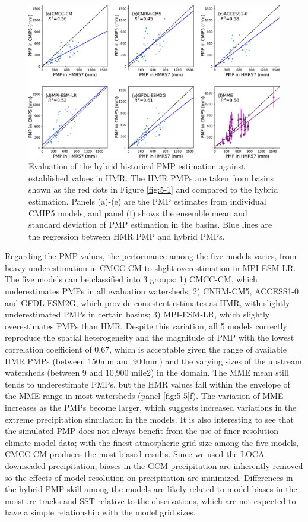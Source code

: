 \begin{figure}[htbp]
	\includegraphics[width=\linewidth]{pics/ch5/fig6.jpg}
	\caption{Evaluation of the hybrid historical PMP estimation against established values in HMR. The HMR PMPs are taken from basins shown as the red dots in Figure \ref{fig:5-1} and compared to the hybrid estimation. Panels (a)-(e) are the PMP estimates from individual CMIP5 models, and panel (f) shows the ensemble mean and standard deviation of PMP estimation in the basins. Blue lines are the regression between HMR PMP and hybrid PMPs.}
	\label{fig:5-6}
\end{figure}

Regarding the PMP values, the performance among the five models varies, from heavy underestimation in CMCC-CM to slight overestimation in MPI-ESM-LR. The five models can be classified into 3 groups: 1) CMCC-CM, which underestimates PMPs in all evaluation watersheds; 2) CNRM-CM5, ACCESS1-0 and GFDL-ESM2G, which provide consistent estimates as HMR, with slightly underestimated PMPs in certain basins; 3) MPI-ESM-LR, which slightly overestimates PMPs than HMR. Despite this variation, all 5 models correctly reproduce the spatial heterogeneity and the magnitude of PMP with the lowest correlation coefficient of 0.67, which is acceptable given the range of available HMR PMPs (between 150mm and 900mm) and the varying sizes of the upstream watersheds (between 9 and 10,900 mile2) in the domain. The MME mean still tends to underestimate PMPs, but the HMR values fall within the envelope of the MME range in most watersheds (panel \ref{fig:5-5}f). The variation of MME increases as the PMPs become larger, which suggests increased variations in the extreme precipitation simulation in the models. It is also interesting to see that the simulated PMP does not always benefit from the use of finer resolution climate model data; with the finest atmospheric grid size among the five models, CMCC-CM produces the most biased results. Since we used the LOCA downscaled precipitation, biases in the GCM precipitation are inherently removed so the effects of model resolution on precipitation are minimized. Differences in the hybrid PMP skill among the models are likely related to model biases in the moisture tracks and SST relative to the observations, which are not expected to have a simple relationship with the model grid sizes.

